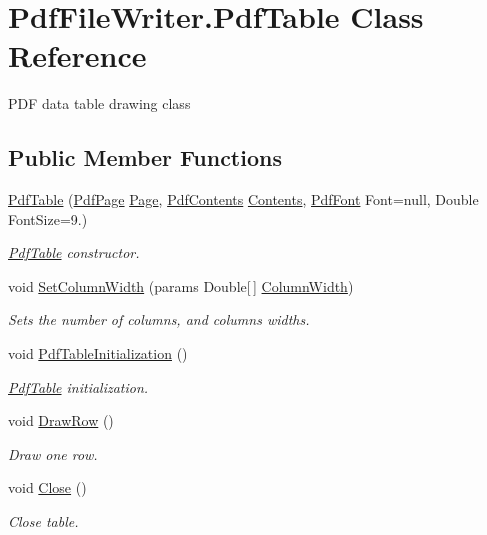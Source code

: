 \hypertarget{class_pdf_file_writer_1_1_pdf_table}{}\section{Pdf\+File\+Writer.\+Pdf\+Table Class Reference}
\label{class_pdf_file_writer_1_1_pdf_table}


P\+DF data table drawing class  


\subsection*{Public Member Functions}
\begin{DoxyCompactItemize}
\item 
\hyperlink{class_pdf_file_writer_1_1_pdf_table_a088d3d729902c78097bd8505ddd5ec23}{Pdf\+Table} (\hyperlink{class_pdf_file_writer_1_1_pdf_page}{Pdf\+Page} \hyperlink{class_pdf_file_writer_1_1_pdf_table_a430064f3636c28ed3cb46a3a4535b253}{Page}, \hyperlink{class_pdf_file_writer_1_1_pdf_contents}{Pdf\+Contents} \hyperlink{class_pdf_file_writer_1_1_pdf_table_ae2afb49f8b53a3d28cc2ddbe086574d5}{Contents}, \hyperlink{class_pdf_file_writer_1_1_pdf_font}{Pdf\+Font} Font=null, Double Font\+Size=9.)
\begin{DoxyCompactList}\small\item\em \hyperlink{class_pdf_file_writer_1_1_pdf_table}{Pdf\+Table} constructor. \end{DoxyCompactList}\item 
void \hyperlink{class_pdf_file_writer_1_1_pdf_table_a21f9cad206bf972104a3163bdfd7caf2}{Set\+Column\+Width} (params Double\mbox{[}$\,$\mbox{]} \hyperlink{class_pdf_file_writer_1_1_pdf_table_a7c925f9f99dcd41a93adfa92a4d312c5}{Column\+Width})
\begin{DoxyCompactList}\small\item\em Sets the number of columns, and column\textquotesingle{}s widths. \end{DoxyCompactList}\item 
void \hyperlink{class_pdf_file_writer_1_1_pdf_table_aa8cac1d885ffd208b9a0d497bbe38505}{Pdf\+Table\+Initialization} ()
\begin{DoxyCompactList}\small\item\em \hyperlink{class_pdf_file_writer_1_1_pdf_table}{Pdf\+Table} initialization. \end{DoxyCompactList}\item 
void \hyperlink{class_pdf_file_writer_1_1_pdf_table_a2f5cea9ae7ca0dbd56dec6acfe5b4d92}{Draw\+Row} ()
\begin{DoxyCompactList}\small\item\em Draw one row. \end{DoxyCompactList}\item 
void \hyperlink{class_pdf_file_writer_1_1_pdf_table_a6cd148bc6a3f24f4b7e483aa126cbd40}{Close} ()
\begin{DoxyCompactList}\small\item\em Close table. \end{DoxyCompactList}\end{DoxyCompactItemize}
